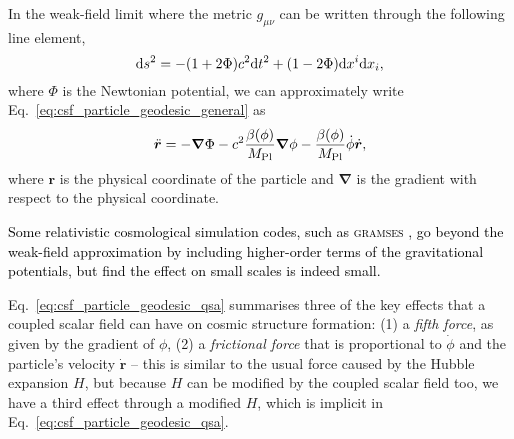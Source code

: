 In the weak-field limit where the metric $g_{\mu\nu}$ can be written through the following line element,
\begin{equation}
    {\rm d}s^2 = -(1+2\Phi)c^2{\rm d}t^2 + (1-2\Phi){\rm d}x^i{\rm d}x_i,
\end{equation}
where $\Phi$ is the Newtonian potential, we can approximately write Eq.~\eqref{eq:csf_particle_geodesic_general} as
\begin{equation}\label{eq:csf_particle_geodesic_qsa}
    \ddot{\boldsymbol{r}} = -\boldsymbol{\nabla}\Phi - c^2\frac{\beta(\phi)}{M_{\rm Pl}}\boldsymbol{\nabla}\phi - \frac{\beta(\phi)}{M_{\rm Pl}}\dot{\phi}\dot{\boldsymbol{r}},
\end{equation}
where $\boldsymbol{r}$ is the physical coordinate of the particle and $\boldsymbol{\nabla}$ is the gradient with respect to the physical coordinate. 

\textcolor{black}{Some relativistic cosmological simulation codes, such as \textsc{gramses} \citep{Barrera-Hinojosa:2020JCAP...01..007B,Barrera-Hinojosa:2020JCAP...04..056B}, go beyond the weak-field approximation by including higher-order terms of the gravitational potentials, but find the effect on small scales is indeed small.}

Eq.~\eqref{eq:csf_particle_geodesic_qsa} summarises three of the key effects that a coupled scalar field can have on cosmic structure formation: (1) a \textit{fifth force}, as given by the gradient of $\phi$, (2) a \textit{frictional force} that is proportional to $\dot{\phi}$ and the particle's velocity $\dot{\boldsymbol{r}}$ -- this is similar to the usual  force caused by the Hubble expansion $H$, but because $H$ can be modified by the coupled scalar field too, we have a third effect through a modified $H$, which is implicit in Eq.~\eqref{eq:csf_particle_geodesic_qsa}.


